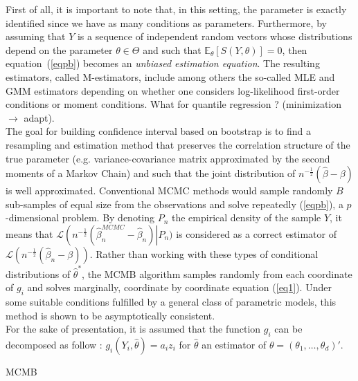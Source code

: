 \documentclass[11pt]{article}
\makeatletter
\def\BState{\State\hskip-\ALG@thistlm}
\makeatother
\begin{document}
First of all, it is important to note that, in this setting, the parameter is exactly identified since we have as many conditions as parameters. Furthermore, by assuming that $Y$ is a sequence of independent random vectors whose distributions depend on the parameter $\theta \in \Theta$ and such that $\mathbb{E}_{\theta}\left[S(Y,\theta)\right] =0 $, then equation~(\ref{eqpb}) becomes an \emph{unbiased estimation equation}. The resulting estimators, called M-estimators, include among others the so-called MLE and GMM estimators depending on whether one considers log-likelihood first-order conditions or moment conditions. What for quantile regression ? (minimization $\to$ adapt). \\

The goal for building confidence interval based on bootstrap is to find a resampling and estimation method that preserves the correlation structure of the true parameter (e.g. variance-covariance matrix approximated by the second moments of a Markov Chain) and such that the joint distribution of $n^{-\frac{1}{2}}(\hat{\beta} - \beta)$ is well approximated.  Conventional MCMC methods would sample randomly $B$ sub-samples of equal size from the observations and solve repeatedly (\ref{eqpb}), a $p$-dimensional problem. By denoting $P_n$ the empirical density of the sample $Y$, it means that $\mathcal{L}\left(n^{-\frac{1}{2}}(\hat{\beta}_n^{MCMC} - \hat{\beta}_n)\right | P_n)$ is considered as a correct estimator of $\mathcal{L} \left(n^{-\frac{1}{2}}(\hat{\beta}_n - \beta)\right)$. Rather than working with these types of conditional distributions of $\hat{\theta}^{*}$, the MCMB algorithm samples randomly from each coordinate of $g_i$ and solves marginally, coordinate by coordinate equation (\ref{eq1}). Under some suitable conditions fulfilled by a general class of parametric models, this method is shown to be asymptotically consistent. \\

For the sake of presentation, it is assumed that the function $g_i$ can be decomposed as follow : $g_i(Y_i, \hat{\theta}) = a_iz_{i}$ for $\hat{\theta}$ an estimator of $\theta = (\theta_1, \dots, \theta_d)'$.
\begin{algorithm}
\caption{MCMB}\label{euclid}
\end{algorithm}
\end{document}
